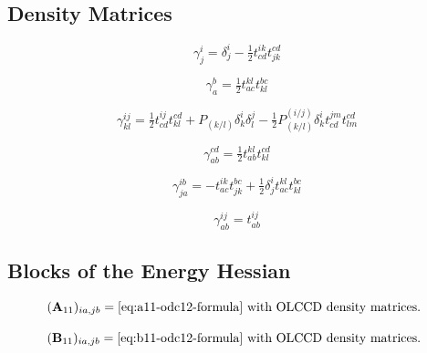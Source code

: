 \begin{subappendices}
\subsection{Density Matrices}

\begin{equation}
    \gamma^i_j
    =
    \delta^i_j
    -
    \tfrac{1}{2}
    t_{cd}^{ik}
    t_{jk}^{cd}
\end{equation}

\begin{equation}
    \gamma^b_a
    =
    \tfrac{1}{2}
    t_{ac}^{kl}
    t_{kl}^{bc}
\end{equation}

\begin{equation}
    \gamma^{ij}_{kl}
    =
    \tfrac{1}{2}
    t_{cd}^{ij}
    t_{kl}^{cd}
    +
    P_{(k/l)}
    \delta^i_k
    \delta^j_l
    -
    \tfrac{1}{2}
    P_{(k/l)}^{(i/j)}
    \delta^i_k
    t_{cd}^{jm}
    t_{lm}^{cd}
\end{equation}

\begin{equation}
    \gamma_{ab}^{cd}
    =
    \tfrac{1}{2}
    t_{ab}^{kl}
    t_{kl}^{cd}
\end{equation}

\begin{equation}
    \gamma_{ja}^{ib}
    =
    -
    t_{ac}^{ik}
    t_{jk}^{bc}
    +
    \tfrac{1}{2}
    \delta^i_j
    t_{ac}^{kl}
    t_{kl}^{bc}
\end{equation}

\begin{equation}
    \gamma_{ab}^{ij}
    =
    t_{ab}^{ij}
\end{equation}

\subsection{Blocks of the Energy Hessian}

\begin{equation}
    (\mathbf{A}_{11})_{ia,jb}
    =
    \text{%
        \Cref{eq:a11-odc12-formula} with OLCCD density matrices.
    }
\end{equation}

\begin{equation}
    (\mathbf{B}_{11})_{ia,jb}
    =
    \text{%
        \Cref{eq:b11-odc12-formula} with OLCCD density matrices.
    }
\end{equation}


\end{subappendices}
